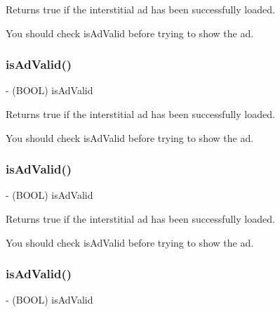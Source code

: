 Returns true if the interstitial ad has been successfully loaded.

You should check {\ttfamily is\+Ad\+Valid} before trying to show the ad. \mbox{\label{interfaceFBInterstitialAd_aff851ea8a260430a5b09bce633826876}} 
\subsubsection{\texorpdfstring{is\+Ad\+Valid()}{isAdValid()}\hspace{0.1cm}{\footnotesize\ttfamily [3/5]}}
{\footnotesize\ttfamily -\/ (B\+O\+OL) is\+Ad\+Valid \begin{DoxyParamCaption}{ }\end{DoxyParamCaption}}

Returns true if the interstitial ad has been successfully loaded.

You should check {\ttfamily is\+Ad\+Valid} before trying to show the ad. \mbox{\label{interfaceFBInterstitialAd_aff851ea8a260430a5b09bce633826876}} 
\subsubsection{\texorpdfstring{is\+Ad\+Valid()}{isAdValid()}\hspace{0.1cm}{\footnotesize\ttfamily [4/5]}}
{\footnotesize\ttfamily -\/ (B\+O\+OL) is\+Ad\+Valid \begin{DoxyParamCaption}{ }\end{DoxyParamCaption}}

Returns true if the interstitial ad has been successfully loaded.

You should check {\ttfamily is\+Ad\+Valid} before trying to show the ad. \mbox{\label{interfaceFBInterstitialAd_aff851ea8a260430a5b09bce633826876}} 
\subsubsection{\texorpdfstring{is\+Ad\+Valid()}{isAdValid()}\hspace{0.1cm}{\footnotesize\ttfamily [5/5]}}
{\footnotesize\ttfamily -\/ (B\+O\+OL) is\+Ad\+Valid \begin{DoxyParamCaption}{ }\end{DoxyParamCaption}}

